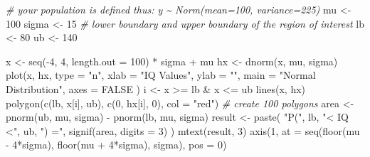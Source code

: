 \documentclass[
  11pt,
  a4paper,
]{book}
\newenvironment{Shaded}{\begin{snugshade}}{\end{snugshade}}
\newcommand{\AttributeTok}[1]{\textcolor[rgb]{0.77,0.63,0.00}{#1}}
\newcommand{\CommentTok}[1]{\textcolor[rgb]{0.56,0.35,0.01}{\textit{#1}}}
\newcommand{\ConstantTok}[1]{\textcolor[rgb]{0.00,0.00,0.00}{#1}}
\newcommand{\DecValTok}[1]{\textcolor[rgb]{0.00,0.00,0.81}{#1}}
\newcommand{\FunctionTok}[1]{\textcolor[rgb]{0.00,0.00,0.00}{#1}}
\newcommand{\NormalTok}[1]{#1}
\newcommand{\OtherTok}[1]{\textcolor[rgb]{0.56,0.35,0.01}{#1}}
\newcommand{\SpecialCharTok}[1]{\textcolor[rgb]{0.00,0.00,0.00}{#1}}
\newcommand{\StringTok}[1]{\textcolor[rgb]{0.31,0.60,0.02}{#1}}
\begin{document}
\begin{Shaded}
\begin{Highlighting}[]
\CommentTok{\# your population is defined thus: y \textasciitilde{} Norm(mean=100, variance=225) }
\NormalTok{mu }\OtherTok{\textless{}{-}} \DecValTok{100}
\NormalTok{sigma }\OtherTok{\textless{}{-}} \DecValTok{15}
\CommentTok{\# lower boundary and upper boundary of the region of interest}
\NormalTok{lb }\OtherTok{\textless{}{-}} \DecValTok{80}
\NormalTok{ub }\OtherTok{\textless{}{-}} \DecValTok{140} 

\NormalTok{x }\OtherTok{\textless{}{-}} \FunctionTok{seq}\NormalTok{(}\SpecialCharTok{{-}}\DecValTok{4}\NormalTok{, }\DecValTok{4}\NormalTok{, }\AttributeTok{length.out =} \DecValTok{100}\NormalTok{) }\SpecialCharTok{*}\NormalTok{ sigma }\SpecialCharTok{+}\NormalTok{ mu}
\NormalTok{hx }\OtherTok{\textless{}{-}} \FunctionTok{dnorm}\NormalTok{(x, mu, sigma)}
\FunctionTok{plot}\NormalTok{(x, hx,}
  \AttributeTok{type =} \StringTok{"n"}\NormalTok{, }\AttributeTok{xlab =} \StringTok{"IQ Values"}\NormalTok{, }\AttributeTok{ylab =} \StringTok{""}\NormalTok{,}
  \AttributeTok{main =} \StringTok{"Normal Distribution"}\NormalTok{, }\AttributeTok{axes =} \ConstantTok{FALSE}
\NormalTok{)}
\NormalTok{i }\OtherTok{\textless{}{-}}\NormalTok{ x }\SpecialCharTok{\textgreater{}=}\NormalTok{ lb }\SpecialCharTok{\&}\NormalTok{ x }\SpecialCharTok{\textless{}=}\NormalTok{ ub}
\FunctionTok{lines}\NormalTok{(x, hx)}
\FunctionTok{polygon}\NormalTok{(}\FunctionTok{c}\NormalTok{(lb, x[i], ub), }\FunctionTok{c}\NormalTok{(}\DecValTok{0}\NormalTok{, hx[i], }\DecValTok{0}\NormalTok{), }\AttributeTok{col =} \StringTok{"red"}\NormalTok{) }\CommentTok{\# create 100 polygons}
\NormalTok{area }\OtherTok{\textless{}{-}} \FunctionTok{pnorm}\NormalTok{(ub, mu, sigma) }\SpecialCharTok{{-}} \FunctionTok{pnorm}\NormalTok{(lb, mu, sigma)}
\NormalTok{result }\OtherTok{\textless{}{-}} \FunctionTok{paste}\NormalTok{(}
  \StringTok{"P("}\NormalTok{, lb, }\StringTok{"\textless{} IQ \textless{}"}\NormalTok{, ub, }\StringTok{") ="}\NormalTok{,}
  \FunctionTok{signif}\NormalTok{(area, }\AttributeTok{digits =} \DecValTok{3}\NormalTok{)}
\NormalTok{)}
\FunctionTok{mtext}\NormalTok{(result, }\DecValTok{3}\NormalTok{)}
\FunctionTok{axis}\NormalTok{(}\DecValTok{1}\NormalTok{, }\AttributeTok{at =} \FunctionTok{seq}\NormalTok{(}\FunctionTok{floor}\NormalTok{(mu }\SpecialCharTok{{-}} \DecValTok{4}\SpecialCharTok{*}\NormalTok{sigma), }\FunctionTok{floor}\NormalTok{(mu }\SpecialCharTok{+} \DecValTok{4}\SpecialCharTok{*}\NormalTok{sigma), sigma), }\AttributeTok{pos =} \DecValTok{0}\NormalTok{)}
\end{Highlighting}
\end{Shaded}
\end{document}
